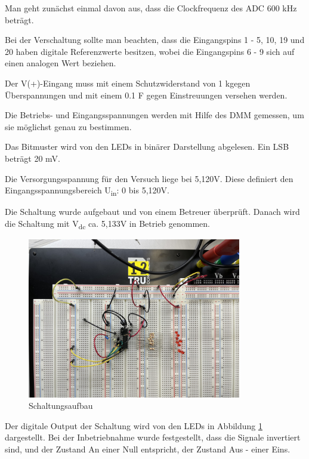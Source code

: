 Man geht zunächst einmal davon aus, dass die Clockfrequenz des ADC 600 kHz beträgt.\par
Bei der Verschaltung sollte man beachten, dass die Eingangspins 1 - 5, 10, 19 und 20 
haben digitale Referenzwerte besitzen, wobei die Eingangspins 6 - 9 sich auf einen analogen Wert beziehen.\par
Der V(+)-Eingang muss mit einem Schutzwiderstand von 1 k\textOmega   gegen Überspannungen 
und mit einem 0.1 \textmu F gegen Einstreuungen versehen werden. \par

Die Betriebs- und Eingangsspannungen werden mit Hilfe des \acs{DMM} gemessen, um sie möglichst 
genau zu bestimmen.\par
Das Bitmuster wird von den \acs{LED}s in binärer Darstellung abgelesen. Ein \acs{LSB} beträgt 20 mV.\par
Die Versorgungsspannung für den Versuch liege bei 5,120V. Diese definiert den 
Eingangsspannungsbereich U\textsubscript{in}: 0 bis 5,120V. \newline


Die Schaltung wurde aufgebaut und von einem Betreuer überprüft. Danach wird die Schaltung
mit V\textsubscript{dc} ca. 5,133V in Betrieb genommen. \par

\begin{figure}[H]
	\centering
	\includegraphics[height=7cm]{images/Schaltungsaufbau-versuch-eins.jpeg} 
	\caption{Schaltungsaufbau}
	\label{fig: Schaltungsaufbau}
\end{figure}

Der digitale Output der Schaltung wird von den \acs{LED}s in Abbildung 
\ref{fig: Schaltungsaufbau} dargestellt.
Bei der Inbetriebnahme wurde festgestellt, dass die Signale invertiert sind, 
und der Zustand An einer Null entspricht, der Zustand Aus - einer Eins.

